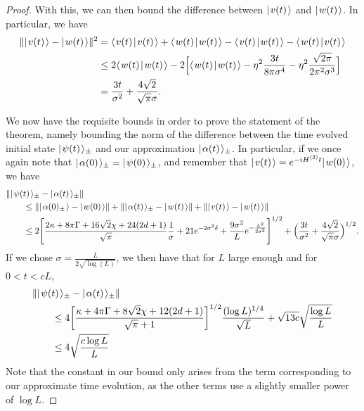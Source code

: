 \documentclass[../thesis-main/thesis-main]{subfiles}
\begin{document}
\begin{proof}
With this, we can then bound the difference between $|\mspace{2mu} v(t) \mspace{2mu} \rangle$ and $|\mspace{2mu} w(t) \mspace{2mu} \rangle$.  In particular, we have
\begin{align}
  \|{|\mspace{2mu} v(t) \mspace{2mu} \rangle - |\mspace{2mu} w(t) \mspace{2mu} \rangle}\|^2 &= \langle\mspace{2mu} v(t) \mspace{2mu} | \mspace{2mu} v(t)\mspace{2mu} \rangle + \langle\mspace{2mu} w(t) \mspace{2mu} | \mspace{2mu} w(t)\mspace{2mu} \rangle - \langle\mspace{2mu} v(t) \mspace{2mu} | \mspace{2mu} w(t)\mspace{2mu} \rangle - \langle\mspace{2mu} w(t) \mspace{2mu} | \mspace{2mu} v(t)\mspace{2mu} \rangle\\
  & \leq  2 \langle\mspace{2mu} w(t) \mspace{2mu} | \mspace{2mu} w(t)\mspace{2mu} \rangle - 2 \Big[ \langle\mspace{2mu} w(t) \mspace{2mu} | \mspace{2mu} w(t)\mspace{2mu} \rangle  -\eta^2 \frac{3t}{8\pi \sigma^4} - \eta^2 \frac{\sqrt{2\pi}}{2 \pi^2 \sigma^3}\Big]\\
  & = \frac{3t}{\sigma^2} + \frac{4 \sqrt{2}}{\sqrt{\pi} \sigma}.
\end{align}


We now have the requisite bounds in order to prove the statement of the theorem, namely bounding the norm of the difference between the time evolved initial state $|\mspace{2mu} \psi(t) \mspace{2mu} \rangle_{\pm}$ and our approximation $|\mspace{2mu} \alpha(t) \mspace{2mu} \rangle_{\pm}$.  In particular, if we once again note that $|\mspace{2mu} \alpha(0) \mspace{2mu} \rangle_\pm = |\mspace{2mu} \psi(0) \mspace{2mu} \rangle_{\pm}$, and remember that $|\mspace{2mu} v(t) \mspace{2mu} \rangle = e^{- i H^{(2)} t} |\mspace{2mu} w(0) \mspace{2mu} \rangle$, we have
\begin{align}
  &\|{ |\mspace{2mu} \psi(t) \mspace{2mu} \rangle_{\pm} - |\mspace{2mu} \alpha(t) \mspace{2mu} \rangle_{\pm}}\| \nonumber\\
  &\qquad\leq \|{|\mspace{2mu} \alpha(0)_\pm \mspace{2mu} \rangle - |\mspace{2mu} w(0) \mspace{2mu} \rangle}\| + \|{ |\mspace{2mu} \alpha(t) \mspace{2mu} \rangle_{\pm} - |\mspace{2mu} w(t) \mspace{2mu} \rangle}\| + \|{|\mspace{2mu} v(t) \mspace{2mu} \rangle - |\mspace{2mu} w(t) \mspace{2mu} \rangle}\|\\
   & \qquad\leq 2 \Bigg[\frac{2\kappa + 8\pi \Gamma + 16\sqrt{2} \chi + 24(2d+1)}{\sqrt{\pi}} \frac{1}{\sigma}    + 21 e^{-2\sigma^2 \delta} + \frac{9 \sigma^2}{L} e^{-\frac{L^2}{2\sigma^2}}\Bigg]^{1/2} + \Big(\frac{3t}{\sigma^2} + \frac{4\sqrt{2}}{\sqrt{\pi} \sigma}\Big)^{1/2}.
\end{align}
If we chose $\sigma = \frac{ L}{2 \sqrt{\log(L)}}$, we then have that for $L$ large enough and for $0 < t < c L$,
\begin{align}
  &\|{ |\mspace{2mu} \psi(t) \mspace{2mu} \rangle_{\pm} - |\mspace{2mu} \alpha(t) \mspace{2mu} \rangle_{\pm}}\| \nonumber\\
  &\qquad\leq 4 \bigg[\frac{\kappa + 4\pi \Gamma + 8\sqrt{2} \chi + 12(2d+1)}{\sqrt{\pi}+1} \bigg]^{1/2}\frac{(\log L)^{1/4}}{\sqrt{L}} + \sqrt{13 c} \sqrt{ \frac{ \log L}{L}}\\
  & \qquad \leq 4\sqrt{\frac{c \log L}{L}}
\end{align}
Note that the constant in our bound only arises from the term corresponding to our approximate time evolution, as the other terms use a slightly smaller power of $\log L$.  
\end{proof}


\end{document}
